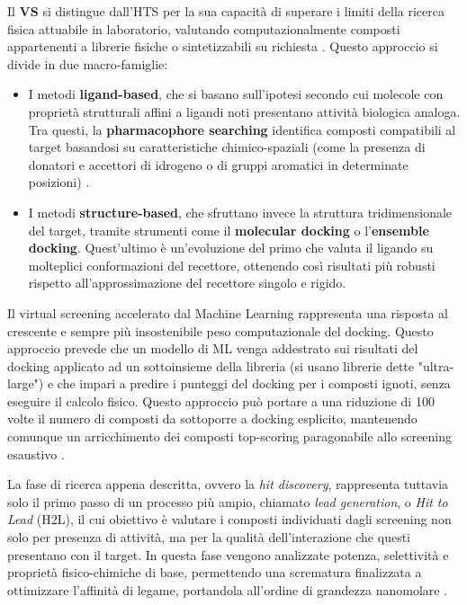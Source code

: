 Il \textbf{VS} si distingue dall'HTS per la sua capacità di superare i limiti della ricerca fisica attuabile in laboratorio, valutando computazionalmente composti appartenenti a librerie fisiche o sintetizzabili su richiesta \cite{carlssonStructurebasedVirtualScreening2024}.
Questo approccio si divide in due macro-famiglie:
\begin{itemize}
    \item I metodi \textbf{ligand-based}, che si basano sull'ipotesi secondo cui molecole con proprietà strutturali affini a ligandi noti presentano attività biologica analoga. Tra questi, la \textbf{pharmacophore searching} identifica composti compatibili al target basandosi su caratteristiche chimico-spaziali (come la presenza di donatori e accettori di idrogeno o di gruppi aromatici in determinate posizioni) \cite{mcinnesVirtualScreeningStrategies2007a}.
    \item I metodi \textbf{structure-based}, che sfruttano invece la struttura tridimensionale del target, tramite strumenti come il \textbf{molecular docking} o l'\textbf{ensemble docking}. Quest'ultimo è un'evoluzione del primo che valuta il ligando su molteplici conformazioni del recettore, ottenendo così risultati più robusti rispetto all'approssimazione del recettore singolo e rigido.
\end{itemize}
Il virtual screening accelerato dal Machine Learning rappresenta una risposta al crescente e sempre più insostenibile peso computazionale del docking. Questo approccio prevede che un modello di ML venga addestrato sui risultati del docking applicato ad un sottoinsieme della libreria (si usano librerie dette "ultra-large") e che impari a predire i punteggi del docking per i composti ignoti, senza eseguire il calcolo fisico. Questo approccio può portare a una riduzione di 100 volte il numero di composti da sottoporre a docking esplicito, mantenendo comunque un arricchimento dei composti top-scoring paragonabile allo screening esaustivo \cite{carlssonStructurebasedVirtualScreening2024}.

La fase di ricerca appena descritta, ovvero la \textit{hit discovery}, rappresenta tuttavia solo il primo passo di un processo più ampio, chiamato \textit{lead generation}, o \textit{Hit to Lead} (H2L), il cui obiettivo è valutare i composti individuati dagli screening non solo per presenza di attività, ma per la qualità dell'interazione che questi presentano con il target. 
In questa fase vengono analizzate potenza, selettività e proprietà fisico-chimiche di base, permettendo una scrematura finalizzata a ottimizzare l'affinità di legame, portandola all'ordine di grandezza nanomolare \cite{barcelosLeadOptimizationDrug2022}.

